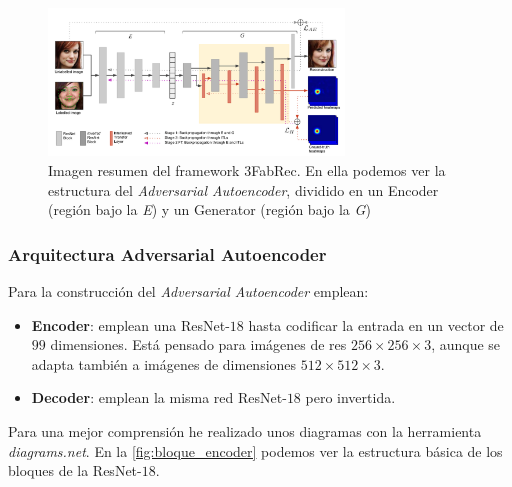         \begin{figure}[!h]
            \centering
            \includegraphics[width=0.7\textwidth]{img/3fabrec_arquitectura.png}
            \caption{Imagen resumen del framework 3FabRec. En ella podemos ver la estructura del \textit{Adversarial Autoencoder}, dividido en un Encoder (región bajo la \textit{E}) y un Generator (región bajo la \textit{G}) }
            \label{fig:3FabRec Resumen}
        \end{figure}

        \subsubsection{Arquitectura Adversarial Autoencoder}
            \noindent Para la construcción del \textit{Adversarial Autoencoder} emplean:
            
            \begin{itemize}
                \item \textbf{Encoder}: emplean una ResNet-$18$  hasta codificar la entrada en un vector de $99$ dimensiones. Está pensado para imágenes de res $256 \times 256 \times 3$, aunque se adapta también a imágenes de dimensiones $512 \times 512 \times 3$.
                \item \textbf{Decoder}: emplean la misma red ResNet-$18$ pero invertida.
            \end{itemize}

            \noindent Para una mejor comprensión he realizado unos diagramas con la herramienta \textit{diagrams.net}. En la \autoref{fig:bloque_encoder} podemos ver la estructura básica de los bloques de la ResNet-$18$.

